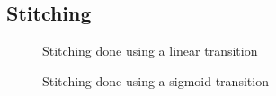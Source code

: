 \subsection{Stitching}

\begin{figure}[H]
  \centering
  \caption{Stitching done using a linear transition}
  \label{fig:results:stitching:linear}
\end{figure}

\begin{figure}[H]
  \centering
  \caption{Stitching done using a sigmoid transition}
  \label{fig:results:stitching:sigmoid}
\end{figure}
